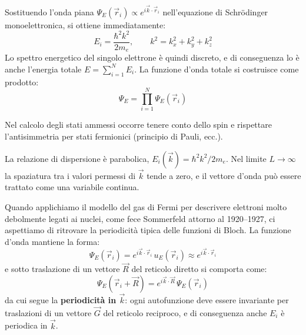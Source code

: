 Sostituendo l'onda piana \(\Psi_E(\vec{r}_i) \propto e^{i\vec{k}\cdot\vec{r}_i}\) nell'equazione di Schrödinger monoelettronica, si ottiene immediatamente:
\begin{equation}
    E_i = \frac{\hbar^2 k^2}{2m_e}, \qquad k^2 = k_x^2 + k_y^2 + k_z^2
\end{equation}
Lo spettro energetico del singolo elettrone è quindi discreto, e di conseguenza lo è anche l'energia totale \(E = \sum_{i=1}^{N} E_i\). La funzione d'onda totale si costruisce come prodotto:
\begin{equation}
    \Psi_E = \prod_{i=1}^{N} \Psi_E(\vec{r}_i)
\end{equation}

\begin{remark}
Nel calcolo degli stati ammessi occorre tenere conto dello spin e rispettare l'antisimmetria per stati fermionici (principio di Pauli, ecc.).
\end{remark}

La relazione di dispersione è parabolica, \(E_i(\vec{k}) = \hbar^2 k^2 / 2m_e\). Nel limite \(L \to \infty\) la spaziatura tra i valori permessi di \(\vec{k}\) tende a zero, e il vettore d'onda può essere trattato come una variabile continua.

Quando applichiamo il modello del gas di Fermi per descrivere elettroni molto debolmente legati ai nuclei, come fece Sommerfeld attorno al 1920--1927, ci aspettiamo di ritrovare la periodicità tipica delle funzioni di Bloch. La funzione d'onda mantiene la forma:
\begin{equation}
    \Psi_E(\vec{r}_i) = e^{i\vec{k}\cdot\vec{r}_i}\, u_E(\vec{r}_i) \approx e^{i\vec{k}\cdot\vec{r}_i}
\end{equation}
e sotto traslazione di un vettore \(\vec{R}\) del reticolo diretto si comporta come:
\begin{equation}
    \Psi_E(\vec{r}_i + \vec{R}) = e^{i\vec{k}\cdot\vec{R}}\, \Psi_E(\vec{r}_i)
\end{equation}
da cui segue la \textbf{periodicità in \(\vec{k}\)}: ogni autofunzione deve essere invariante per traslazioni di un vettore \(\vec{G}\) del reticolo reciproco, e di conseguenza anche \(E_i\) è periodica in \(\vec{k}\).

